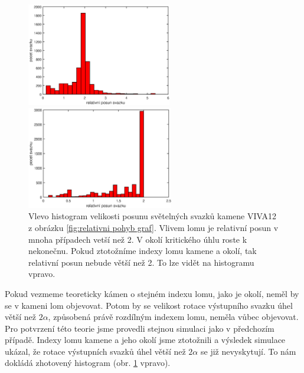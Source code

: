 \begin{figure}[h!]
 \begin{center}
 

   \begin{minipage}[c]{0.45\textwidth}
     \centering \includegraphics[height =4.5cm]{figures/relative.eps} 
   \end{minipage}
   \begin{minipage}[c]{0.45\textwidth}
     \centering \includegraphics[height =4.5cm]{figures/relative_index1.eps} 
   \end{minipage}
 \end{center}
\caption{Vlevo histogram velikosti posunu světelných svazků kamene VIVA12 z obrázku \ref{fig:relativni pohyb graf}. Vlivem lomu je relativní posun v mnoha případech vetší než 2. V okolí kritického úhlu roste k nekonečnu. Pokud ztotožníme indexy lomu kamene a okolí, tak relativní posun nebude větší než 2. To lze vidět na histogramu vpravo.}

\label{fig:histogram relativni pohyb }

\end{figure}

Pokud vezmeme teoreticky kámen o stejném indexu lomu, jako je okolí, neměl by se v kameni lom objevovat. Potom by se velikost rotace výstupního svazku úhel větší než $2\alpha$, způsobená právě rozdílným indexem lomu,  neměla vůbec objevovat. Pro potvrzení této teorie jsme provedli stejnou simulaci jako v předchozím případě. Indexy lomu kamene a jeho okolí jsme ztotožnili a výsledek simulace ukázal, že rotace výstupních svazků úhel větší než $2\alpha$ se již nevyskytují. To nám dokládá zhotovený histogram (obr. \ref{fig:histogram relativni pohyb } vpravo).



